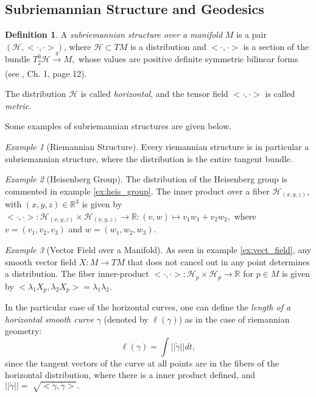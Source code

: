 \documentclass[12pt, letterpaper, reqno]{amsart}
\theoremstyle{definition}
\newtheorem{df}{Definition}
\theoremstyle{plain}
\theoremstyle{remark}
\newtheorem{ex}{Example}
\begin{document}
\subsection{Subriemannian Structure and Geodesics}%
\label{sub:subriemannian_structure_and_geodesics}
\begin{df}
	A \textit{subriemannian structure over a manifold} $ M $ is a pair $ (\mathcal{H}, <\cdot,\cdot>)$, where $ \mathcal{H}\subset TM $ is a distribution and $ <\cdot,\cdot> $ is a section of the bundle $ T^0_2 \mathcal{H} \xrightarrow[]{\pi} M, $ whose values are positive definite symmetric bilinear forms (see \cite{hatcher2003vector}, Ch. 1, page 12).

	The distribution $ \mathcal{H} $ is called \textit{horizontal}, and the tensor field $ <\cdot,\cdot> $ is called \textit{metric}.  
\end{df}

Some examples of subriemannian structures are given below.
\begin{ex}[Riemannian Structure]\label{ex:riem_geo2}
	Every riemannian structure is in particular a subriemannian structure, where the distribution is the entire tangent bundle.
\end{ex}

\begin{ex}[Heisenberg Group]\label{ex:heis_group2}
	The distribution of the Heisenberg group is commented in example \ref{ex:heis_group}. The inner product over a fiber $ \mathcal{H}_{(x,y,z)} $, with $ (x,y,z)\in \mathbb{R}^3 $  is given by $<\cdot,\cdot>:  \mathcal{H}_{(x,y,z)}\times\mathcal{H}_{(x,y,z)} \rightarrow { \mathbb{R} }:(v,w)\mapsto v_1w_1+v_2w_2,$ where $ v=(v_1,v_2,v_3) $ and $ w=(w_1,w_2,w_3). $  

\end{ex}
\begin{ex}[Vector Field over a Manifold]\label{ex:vect_field2}
	As seen in example \ref{ex:vect_field}, any smooth vector field $ X: M \rightarrow TM$ that does not cancel out in any point determines a distribution.  The fiber inner-product $ <\cdot,\cdot>: \mathcal{H}_p \times \mathcal{H}_p \rightarrow \mathbb{R} $ for $ p\in M $  is given by $<\lambda_1 X_p,\lambda_2 X_p>=\lambda_1 \lambda_2.$
\end{ex}
In the particular case of the horizontal curves, one can define the \textit{length of a horizontal smooth curve} $ \gamma $ (denoted by $ \ell(\gamma) $) as in the case of riemannian geometry:
$$ \ell(\gamma) = \int ||\dot{\gamma}|| dt, $$ 
since the tangent vectors of the curve at all points are in the fibers of the horizontal distribution, where there is a inner product defined, and $ ||\dot{\gamma}||= \sqrt[]{<\dot{\gamma}, \dot{\gamma}>}.  $   
\end{document}

